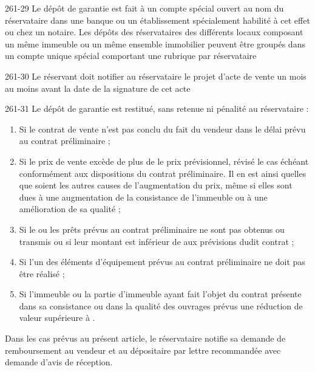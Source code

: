 \begin{enumerate}
						\begin{citationArticle}[R]{261-29}{\cch}
							Le dépôt de garantie est fait à un compte spécial ouvert au nom du réservataire dans une banque ou un établissement spécialement habilité à cet effet ou chez un notaire. Les dépôts des réservataires des différents locaux composant un même immeuble ou un même ensemble immobilier peuvent être groupés dans un compte unique spécial comportant une rubrique par réservataire
						\end{citationArticle}

						\begin{citationArticle}[R]{261-30}{\cch}
							Le réservant doit notifier au réservataire le projet d'acte de vente un mois au moins avant la date de la signature de cet acte
						\end{citationArticle}

						\begin{citationArticle}[R]{261-31}{\cch}
							Le dépôt de garantie est restitué, sans retenue ni pénalité au réservataire :
						\begin{enumerate}[label = \alph*)]
							\item Si le contrat de vente n'est pas conclu du fait du vendeur dans le délai prévu au contrat préliminaire ;
							\item Si le prix de vente excède de plus de  le prix prévisionnel, révisé le cas échéant conformément aux dispositions du contrat préliminaire. Il en est ainsi quelles que soient les autres causes de l'augmentation du prix, même si elles sont dues à une augmentation de la consistance de l'immeuble ou à une amélioration de sa qualité ;
							\item Si le ou les prêts prévus au contrat préliminaire ne sont pas obtenus ou transmis ou si leur montant est inférieur de  aux prévisions dudit contrat ;
							\item Si l'un des éléments d'équipement prévus au contrat préliminaire ne doit pas être réalisé ;
							\item Si l'immeuble ou la partie d'immeuble ayant fait l'objet du contrat présente dans sa consistance ou dans la qualité des ouvrages prévus une réduction de valeur supérieure à \pourcent{10}.
						\end{enumerate}

						Dans les cas prévus au présent article, le réservataire notifie sa demande de remboursement au vendeur et au dépositaire par lettre recommandée avec demande d'avis de réception.


\end{citationArticle}
\end{enumerate}
